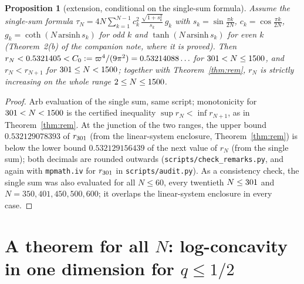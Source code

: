 \documentclass[11pt,a4paper]{article}
\newtheorem{proposition}[theorem]{Proposition}
\theoremstyle{definition}
\theoremstyle{remark}
\begin{document}
\begin{proposition}[extension, conditional on the single-sum formula]\label{prop:rem}
Assume the single-sum formula $\tau_N=4N\sum_{k=1}^{N-1}c_k^2\,\frac{\sqrt{1+s_k^2}}{s_k}\,g_k$ with $s_k=\sin\frac{\pi k}{2N}$, $c_k=\cos\frac{\pi k}{2N}$, $g_k=\coth(N\,\mathrm{arsinh}\,s_k)$ for odd $k$ and $\tanh(N\,\mathrm{arsinh}\,s_k)$ for even $k$ (Theorem~2(b) of the companion note, where it is proved). Then $r_N<0.5321405<C_0:=\varpi^4/(9\pi^2)=0.53214088\ldots$ for $301<N\le1500$, and $r_N<r_{N+1}$ for $301\le N<1500$; together with Theorem~\ref{thm:rem}, $r_N$ is strictly increasing on the whole range $2\le N\le1500$.
\end{proposition}
\begin{proof}
Arb evaluation of the single sum, same script; monotonicity for $301<N<1500$ is the certified inequality $\sup r_N<\inf r_{N+1}$, as in Theorem~\ref{thm:rem}. At the junction of the two ranges, the upper bound $0.532129078393$ of $r_{301}$ (from the linear-system enclosure, Theorem~\ref{thm:rem}) is below the lower bound $0.532129156439$ of the next value of $r_N$ (from the single sum); both decimals are rounded outwards (\texttt{scripts/check\_remarks.py}, and again with \texttt{mpmath.iv} for $r_{301}$ in \texttt{scripts/audit.py}). As a consistency check, the single sum was also evaluated for all $N\le60$, every twentieth $N\le301$ and $N=350,401,450,500,600$; it overlaps the linear-system enclosure in every case.
\end{proof}

\section{A theorem for all $N$: log-concavity in one dimension for $q\le1/2$}
\end{document}
